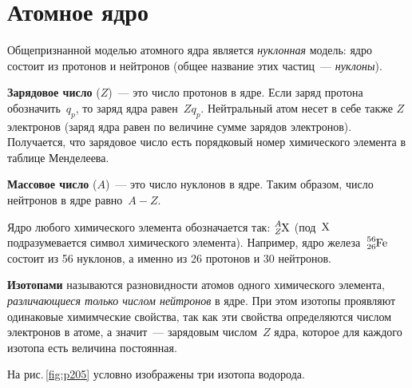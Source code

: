 \documentclass[main.tex]{subfiles}
\begin{document}

 

 

 
   

\section{Атомное ядро}


Общепризнанной моделью атомного ядра является \emph{нуклонная} модель: ядро состоит из протонов и нейтронов (общее название этих частиц~--- \emph{нуклоны}).

\textbf{Зарядовое число} ($Z$)~--- это число протонов в ядре. Если заряд протона обозначить~$q_p$, то заряд ядра равен~$Zq_p$. Нейтральный атом несет в себе также $Z$ электронов (заряд ядра равен по величине сумме зарядов электронов). Получается, что зарядовое число есть порядковый номер химического элемента в таблице Менделеева.

\textbf{Массовое число} ($A$)~--- это число нуклонов в ядре. Таким образом, число нейтронов в ядре равно~$A-Z$.

Ядро любого химического элемента обозначается так:
$\ce{^$A$_$Z$X}$ (под~$\ce{X}$ подразумевается символ химического элемента). Например, ядро железа~$\ce{^56_26Fe}$ состоит из 56 нуклонов, а именно из 26 протонов и 30 нейтронов.

\textbf{Изотопами} называются разновидности атомов одного химического элемента, \emph{различающиеся только числом нейтронов} в ядре. При этом изотопы проявляют одинаковые химимческие свойства, так как эти свойства определяются числом электронов в атоме, а значит~--- зарядовым числом~$Z$ ядра, которое для каждого изотопа есть величина постоянная.

На рис.\,\ref{fig:p205} условно изображены три изотопа водорода. 
\end{document}
